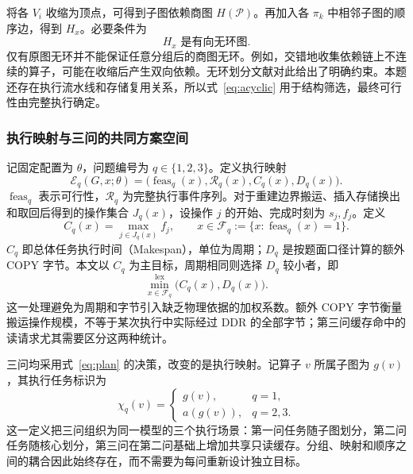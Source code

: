 将各 $V_i$ 收缩为顶点，可得到子图依赖商图 $H(\mathcal P)$。再加入各 $\pi_k$ 中相邻子图的顺序边，得到 $H_x$。必要条件为
\begin{equation}
 H_x\text{ 是有向无环图}.
 \label{eq:acyclic}
\end{equation}
仅有原图无环并不能保证任意分组后的商图无环。例如，交错地收集依赖链上不连续的算子，可能在收缩后产生双向依赖。无环划分文献对此给出了明确约束\cite{A02}。本题还存在执行流水线和存储复用关系，所以式~\eqref{eq:acyclic} 用于结构筛选，最终可行性由完整执行确定。

\subsubsection{执行映射与三问的共同方案空间}
记固定配置为 $\theta$，问题编号为 $q\in\{1,2,3\}$。定义执行映射
\begin{equation}
 \mathcal E_q(G,x;\theta)
 =\bigl(\operatorname{feas}_q(x),\mathcal R_q(x),C_q(x),D_q(x)\bigr).
 \label{eq:evaluator}
\end{equation}
$\operatorname{feas}_q$ 表示可行性，$\mathcal R_q$ 为完整执行事件序列。对于重建边界搬运、插入存储换出和取回后得到的操作集合 $J_q(x)$，设操作 $j$ 的开始、完成时刻为 $s_j,f_j$。定义
\begin{equation}
 C_q(x)=\max_{j\in J_q(x)} f_j,
 \qquad x\in\mathcal F_q:=\{x:\operatorname{feas}_q(x)=1\}.
 \label{eq:makespan}
\end{equation}
$C_q$ 即总体任务执行时间（Makespan），单位为周期；$D_q$ 是按题面口径计算的额外 COPY 字节。本文以 $C_q$ 为主目标，周期相同则选择 $D_q$ 较小者，即
\begin{equation}
 \min_{x\in\mathcal F_q}^{\mathrm{lex}}\bigl(C_q(x),D_q(x)\bigr).
 \label{eq:objective}
\end{equation}
这一处理避免为周期和字节引入缺乏物理依据的加权系数。额外 COPY 字节衡量搬运操作规模，不等于某次执行中实际经过 DDR 的全部字节；第三问缓存命中的读请求尤其需要区分这两种统计。

三问均采用式~\eqref{eq:plan} 的决策，改变的是执行映射。记算子 $v$ 所属子图为 $g(v)$，其执行任务标识为
\begin{equation}
 \chi_q(v)=\begin{cases}g(v),&q=1,\\a(g(v)),&q=2,3.\end{cases}
 \label{eq:task}
\end{equation}
这一定义把三问组织为同一模型的三个执行场景：第一问任务随子图划分，第二问任务随核心划分，第三问在第二问基础上增加共享只读缓存。分组、映射和顺序之间的耦合因此始终存在，而不需要为每问重新设计独立目标。

